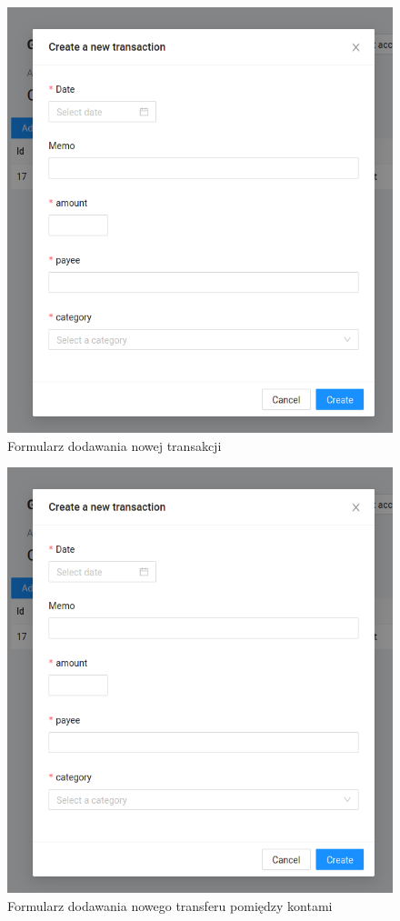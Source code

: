 \documentclass[shortabstract,inz]{iithesis}
\begin{document}
\begin{figure}[h]
	\centering
	\includegraphics[scale=0.7]{screen-new-transaction-form.png}
	\caption{Formularz dodawania nowej transakcji}
	\label{fig:screen-new-transaction}
\end{figure}

\begin{figure}[h!]
	\centering
	\includegraphics[scale=0.7]{screen-new-transaction-form.png}
	\caption{Formularz dodawania nowego transferu pomiędzy kontami}
	\label{fig:screen-new-transfer}
\end{figure}
\end{document}
